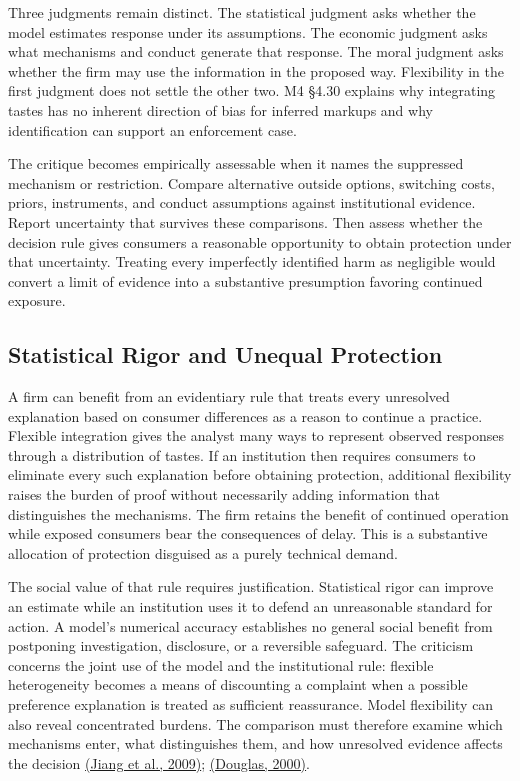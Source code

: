 Three judgments remain distinct. The statistical judgment asks whether
the model estimates response under its assumptions. The economic
judgment asks what mechanisms and conduct generate that response. The
moral judgment asks whether the firm may use the information in the
proposed way. Flexibility in the first judgment does not settle the
other two. M4 §4.30 explains why integrating tastes has no inherent
direction of bias for inferred markups and why identification can
support an enforcement case.

The critique becomes empirically assessable when it names the suppressed
mechanism or restriction. Compare alternative outside options, switching
costs, priors, instruments, and conduct assumptions against
institutional evidence. Report uncertainty that survives these
comparisons. Then assess whether the decision rule gives consumers a
reasonable opportunity to obtain protection under that uncertainty.
Treating every imperfectly identified harm as negligible would convert a
limit of evidence into a substantive presumption favoring continued
exposure.

\hypertarget{M09-statistical-rigor-and-unequal-protection}{%
\subsection{Statistical Rigor and Unequal
Protection}\label{M09-statistical-rigor-and-unequal-protection}}

\noindent \noindent A firm can benefit from an evidentiary rule that treats every
unresolved explanation based on consumer differences as a reason to
continue a practice. Flexible integration gives the analyst many ways to
represent observed responses through a distribution of tastes. If an
institution then requires consumers to eliminate every such explanation
before obtaining protection, additional flexibility raises the burden of
proof without necessarily adding information that distinguishes the
mechanisms. The firm retains the benefit of continued operation while
exposed consumers bear the consequences of delay. This is a substantive
allocation of protection disguised as a purely technical demand.

The social value of that rule requires justification. Statistical rigor
can improve an estimate while an institution uses it to defend an
unreasonable standard for action. A model's numerical accuracy
establishes no general social benefit from postponing investigation,
disclosure, or a reversible safeguard. The criticism concerns the joint
use of the model and the institutional rule: flexible heterogeneity
becomes a means of discounting a complaint when a possible preference
explanation is treated as sufficient reassurance. Model flexibility can
also reveal concentrated burdens. The comparison must therefore examine
which mechanisms enter, what distinguishes them, and how unresolved
evidence affects the decision
\href{https://doi.org/10.1016/j.jeconom.2008.12.010}{(Jiang et al.,
2009)}; \href{https://doi.org/10.1086/392855}{(Douglas, 2000)}.

